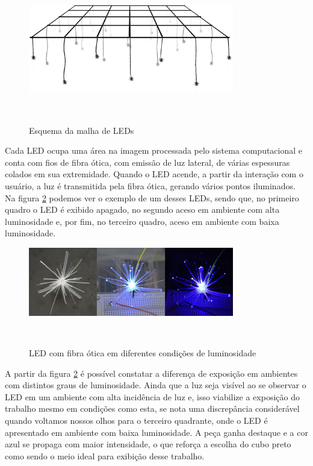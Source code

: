 \begin{figure}[H]
  \begin{center}
    \caption{Esquema da malha de LEDs}
    \vspace*{0,2cm}
    \includegraphics[width=0.8\textwidth]{./04-figuras/malha}
    \label{fig:malha}
  \end{center}
  \vspace*{-0,9cm}
  \\
\end{figure}


Cada LED ocupa uma área na imagem processada pelo sistema computacional e conta com fios de fibra ótica, com emissão de luz lateral, de várias espessuras colados em sua extremidade. Quando o LED acende, a partir da interação com o usuário, a luz é transmitida pela fibra ótica, gerando vários pontos iluminados. Na figura \ref{fig:led_fibra_otica} podemos ver o exemplo de um desses LEDs, sendo que, no primeiro quadro o LED é exibido apagado, no segundo aceso em ambiente com alta luminosidade e, por fim, no terceiro quadro, aceso em ambiente com baixa luminosidade. 

\begin{figure}[H]
  \begin{center}
    \caption{LED com fibra ótica em diferentes condições de luminosidade}
    \vspace*{0,2cm}
    \includegraphics[width=0.8\textwidth]{./04-figuras/led_fibra_otica}
    \label{fig:led_fibra_otica}
  \end{center}
  \vspace*{-0,9cm}
  \\
\end{figure}

A partir da figura \ref{fig:led_fibra_otica} é possível constatar a diferença de exposição em ambientes com distintos graus de luminosidade. Ainda que a luz seja visível ao se observar o LED em um ambiente com alta incidência de luz e, isso viabilize a exposição do trabalho mesmo em condições como esta, se nota uma discrepância considerável quando voltamos nossos olhos para o terceiro quadrante, onde o LED é apresentado em ambiente com baixa luminosidade. A peça ganha destaque e a cor azul se propaga com maior intensidade, o que reforça a escolha do cubo preto como sendo o meio ideal para exibição desse trabalho.

   